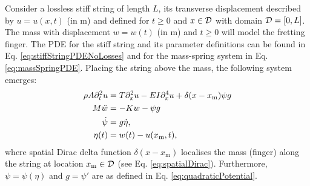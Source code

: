 Consider a lossless stiff string of length $L$, its transverse displacement described by $u = u(x,t)$ (in m) and defined for $t\geq 0$ and $x\in \mathcal{D}$ with domain $\mathcal{D} = [0, L]$. The mass with displacement $w = w(t)$ (in m) and $t\geq 0$ will model the fretting finger. The PDE for the stiff string and its parameter definitions can be found in Eq. \eqref{eq:stiffStringPDENoLosses} and for the mass-spring system in Eq. \eqref{eq:massSpringPDE}. Placing the string above the mass, the following system emerges:
\begin{subequations}\label{eq:massStringPDE}
\begin{align}   
    \rho A \partial_t^2 u & =T\partial_x^2 u - EI\partial_x^4 u + \delta(x-x_\text{m}) \psi g \label{eq:massStringPDE1}\\
    M \ddot w &=-Kw - \psi g\label{eq:massStringPDE2}\\
    \dot\psi &= g \dot\eta,\label{eq:massStringPDE3}\\
    \eta(t) &= w(t) - u(x_\text{m}, t),\label{eq:massStringPDE4}
\end{align}
\end{subequations}
where spatial Dirac delta function $\delta(x-x_\text{m})$ localises the mass (finger) along the string at location $x_\text{m} \in \mathcal{D}$ (see Eq. \eqref{eq:spatialDirac}). Furthermore, $\psi = \psi(\eta)$ and $g=\psi'$ are as defined in Eq. \eqref{eq:quadraticPotential}. 


